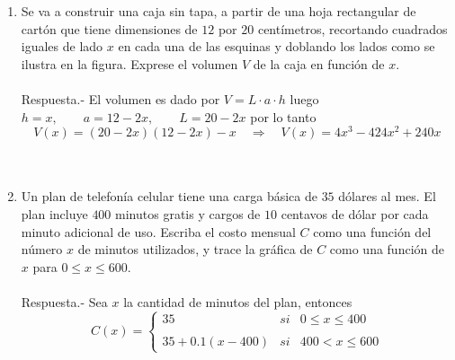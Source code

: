 \begin{enumerate}
    \item Se va a construir una caja sin tapa, a partir de una hoja rectangular de cartón que tiene dimensiones de $12$ por $20$ centímetros, recortando cuadrados iguales de lado $x$ en cada una de las esquinas y doblando los lados como se ilustra en la figura. Exprese el volumen $V$ de la caja en función de $x$.\\\\
	Respuesta.-\; El volumen es dado por $V=L\cdot a\cdot h$ luego $h=x,\qquad a=12-2x, \qquad L=20-2x$ por lo tanto $$V(x)=(20-2x)(12-2x)-x \quad \Longrightarrow \quad V(x)=4x^3 - 424x^2 + 240x$$\\\\

    \item Un plan de telefonía celular tiene una carga básica de $35$ dólares al mes. El plan incluye $400$ minutos gratis y cargos de $10$ centavos de dólar por cada minuto adicional de uso. Escriba el costo mensual $C$ como una función del número $x$ de minutos utilizados, y trace la gráfica de $C$ como una función de $x$ para $0 \leq x \leq 600$.\\\\
	Respuesta.-\; Sea $x$ la cantidad de minutos del plan, entonces 
	    $$C(x)=\left\{\begin{array}{llc}
		35&si&0\leq x\leq 400\\ 
		\\ 35+0.1(x-400)& si &400<x\leq 600
		\end{array}\right.$$
    

\end{enumerate}
